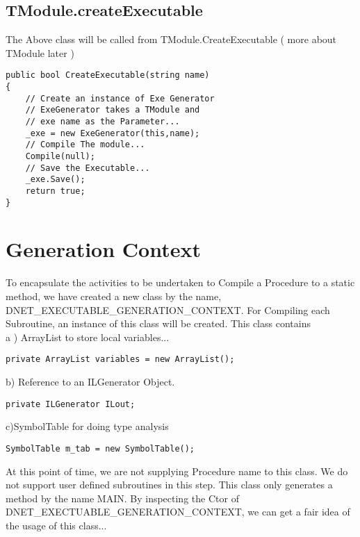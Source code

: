 \subsection{TModule.createExecutable}
The Above class will be called from TModule.CreateExecutable ( more about TModule later )
\lstset{style=csharp}
\begin{lstlisting}
public bool CreateExecutable(string name)
{
	// Create an instance of Exe Generator
	// ExeGenerator takes a TModule and
	// exe name as the Parameter...
	_exe = new ExeGenerator(this,name);
	// Compile The module...
	Compile(null);
	// Save the Executable...
	_exe.Save();
	return true;
}
\end{lstlisting}
\section{Generation Context}
To encapsulate the activities to be undertaken to Compile a Procedure to a static method, we have created a new class by the name, DNET\_EXECUTABLE\_GENERATION\_CONTEXT. For Compiling each Subroutine, an instance of this class will be created. This class contains\\
a ) ArrayList to store local variables...
\lstset{style=csharp}
\begin{lstlisting}
private ArrayList variables = new ArrayList();
\end{lstlisting}

b) Reference to an ILGenerator Object.
\lstset{style=csharp}
\begin{lstlisting}
private ILGenerator ILout;
\end{lstlisting}

c)SymbolTable for doing type analysis
\lstset{style=csharp}
\begin{lstlisting}
SymbolTable m_tab = new SymbolTable();
\end{lstlisting}
At this point of time, we are not supplying Procedure name to this class. We do not support user defined subroutines in this
step. This class only generates a method by the name MAIN.
By inspecting the Ctor of DNET\_EXECTUABLE\_GENERATION\_CONTEXT, we can get a fair idea of the usage of this
class...

